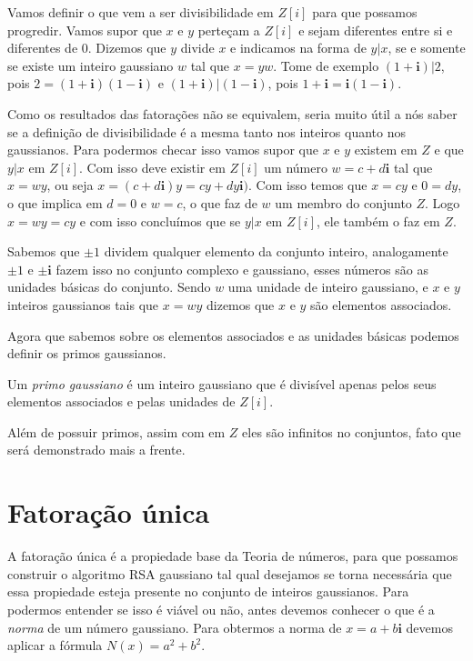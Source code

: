 Vamos definir o que vem a ser divisibilidade em $Z[i]$ para que possamos progredir. Vamos supor que $x$ e $y$ perte\c{c}am a $Z[i]$ e sejam diferentes entre si e diferentes de $0$. Dizemos que $y$ divide $x$ e indicamos na forma de $y|x$, se e somente se existe um inteiro gaussiano $w$ tal que $x=yw$. Tome de exemplo $(1 + \textbf{i})|2$, pois $ 2 = (1 + \textbf{i})(1 - \textbf{i})$ e $(1 + \textbf{i})|(1 - \textbf{i})$, pois $ 1 + \textbf{i} = \textbf{i}(1 - \textbf{i})$.

Como os resultados das fatora\c{c}\~oes n\~ao se equivalem, seria muito \'util a n\'os saber se a defini\c{c}\~ao de divisibilidade \'e a mesma tanto nos inteiros quanto nos gaussianos. Para podermos checar isso vamos supor que $x$ e $y$ existem em $Z$ e que $y|x$ em $Z[i]$. Com isso deve existir em $Z[i]$ um n\'umero $w = c + d\textbf{i}$ tal que $x=wy$, ou seja $x=(c + d\textbf{i})y = cy + dy\textbf{i})$. Com isso temos que $x=cy$ e $0 = dy$, o que implica em $d = 0$ e $w=c$, o que faz de $w$ um membro do conjunto $Z$. Logo $x=wy=cy$ e com isso conclu\'imos que se $y|x$ em $Z[i]$, ele tamb\'em o faz em $Z$.

Sabemos que $\pm 1$ dividem qualquer elemento da conjunto inteiro, analogamente $\pm 1$ e $\pm \textbf{i}$ fazem isso no conjunto complexo e gaussiano, esses n\'umeros s\~ao as unidades b\'asicas do conjunto. Sendo $w$ uma unidade de inteiro gaussiano, e $x$ e $y$ inteiros gaussianos tais que $x = wy$ dizemos que $x$ e $y$ s\~ao elementos associados.

Agora que sabemos sobre os elementos associados e as unidades b\'asicas podemos definir os primos gaussianos. 

\begin{Df}
Um \textit{primo gaussiano} \'e um inteiro gaussiano que \'e divis\'ivel apenas pelos seus elementos associados e pelas unidades de $Z[i]$.
\end{Df} 

Al\'em de possuir primos, assim com em $Z$ eles s\~ao infinitos no conjuntos, fato que ser\'a demonstrado mais a frente.

\section{Fatora\c{c}\~ao \'unica}

\hspace{7mm}A fatora\c{c}\~ao \'unica \'e a propiedade base da Teoria de n\'umeros, para que possamos construir o algoritmo RSA gaussiano tal qual desejamos se torna necess\'aria que essa propiedade esteja presente no conjunto de inteiros gaussianos. Para podermos entender se isso \'e vi\'avel ou n\~ao, antes devemos conhecer o que \'e a \textit{norma} de um n\'umero gaussiano. Para obtermos a norma de $x=a+b\textbf{i}$ devemos aplicar a f\'ormula $N(x) = a^2 + b^2$.

